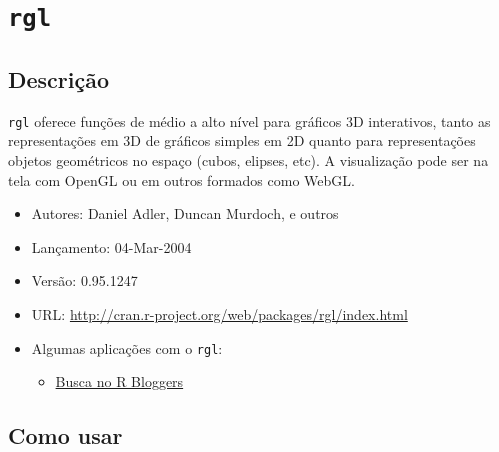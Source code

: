 \section{\texttt{rgl}}

\subsection*{Descrição}


\begin{frame}

  \texttt{rgl} oferece funções de médio a alto nível para gráficos 3D
  interativos, tanto as representações em 3D de gráficos simples em 2D
  quanto para representações objetos geométricos no espaço (cubos,
  elipses, etc). A visualização pode ser na tela com OpenGL ou em outros
  formados como WebGL.

  \begin{itemize}
  \item Autores: Daniel Adler, Duncan Murdoch, e outros
  \item Lançamento: 04-Mar-2004
  \item Versão: 0.95.1247
  \item URL: \url{http://cran.r-project.org/web/packages/rgl/index.html}
  \item Algumas aplicações com o \texttt{rgl}:

  \begin{itemize}
    \itemsep1pt\parskip0pt
  \item \href{http://www.r-bloggers.com/?s=rgl}{Busca no R Bloggers}
  \end{itemize}
\end{itemize}

\end{frame}


\subsection*{Como usar}

\begin{frame}



\end{frame}


